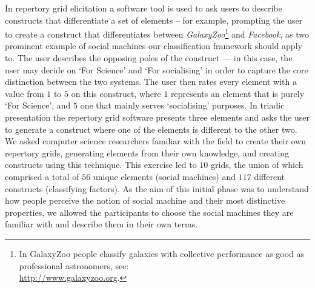 \documentclass{www13-companion-accepted}
\begin{document}
In repertory grid elicitation a software tool is used to ask users to describe constructs
that differentiate a set of elements -- for example, prompting the user to create a construct that
differentiates between {\it GalaxyZoo}\footnote{In GalaxyZoo people classify galaxies with collective performance as good as professional astronomers, see: \\ \url{http://www.galaxyzoo.org}.} and {\it Facebook}, as two prominent example of social machines our classification framework should apply to. The user describes the opposing poles of the construct --- in this case, the user may decide on `For Science' and `For socialising' in order to capture the core distinction between the two systems. The user then rates every element with a value from $1$ to $5$ on this construct, where $1$ represents an element that is purely
`For Science', and $5$ one that mainly serves `socialising' purposes. In triadic presentation the repertory grid software presents three elements and asks the user to generate a construct where one of the elements is different to the other two. We asked computer science researchers familiar with the field to create their own repertory grids, generating elements from their own knowledge, and creating constructs using this technique. This exercise led to $10$ grids, the union of which comprised a total of $56$ unique elements (social machines)
and $117$ different constructs (classifying factors). As the aim of this initial phase was to understand how people perceive the notion of social machine and their most distinctive properties, we allowed the participants to choose the social machines they are familiar with and describe them in their own terms.

\end{document}
